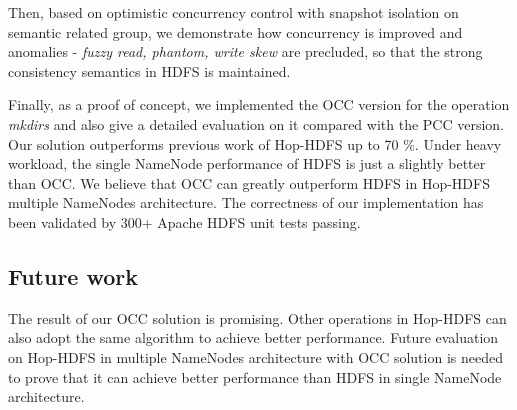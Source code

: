 \documentclass[runningheads,a4paper]{llncs}
\begin{document}
Then, based on optimistic concurrency control with snapshot isolation on semantic related group, we demonstrate how concurrency is improved and anomalies - \textit{fuzzy read, phantom, write skew} are precluded, so that the strong consistency semantics in HDFS is maintained.

Finally, as a proof of concept, we implemented the OCC version for the operation \textit{mkdirs} and also give a detailed evaluation on it compared with the PCC version. Our solution outperforms previous work of Hop-HDFS up to 70 \%. Under heavy workload, the single NameNode performance of HDFS is just a slightly better than OCC. We believe that OCC can greatly outperform HDFS in Hop-HDFS multiple NameNodes architecture. The correctness of our implementation has been validated by 300+ Apache HDFS unit tests passing.

\subsection{Future work}
The result of our OCC solution is promising. Other operations in Hop-HDFS can also adopt the same algorithm to achieve better performance. Future evaluation on Hop-HDFS in multiple NameNodes architecture with OCC solution is needed to prove that it can achieve better performance than HDFS in single NameNode architecture.


\end{document}
